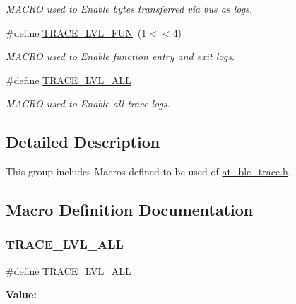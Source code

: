 \begin{DoxyCompactItemize}
\begin{DoxyCompactList}\small\item\em M\+A\+C\+RO used to Enable bytes transferred via bus as logs. \end{DoxyCompactList}\item 
\#define \mbox{\hyperlink{group__dbg__logs__group__macros_ga6c483b2388f6352f68b9a9be81474a74}{T\+R\+A\+C\+E\+\_\+\+L\+V\+L\+\_\+\+F\+UN}}~(1$<$$<$4)
\begin{DoxyCompactList}\small\item\em M\+A\+C\+RO used to Enable function entry and exit logs. \end{DoxyCompactList}\item 
\#define \mbox{\hyperlink{group__dbg__logs__group__macros_gad537d4d9e95c7c0b8df1b63c9675b69f}{T\+R\+A\+C\+E\+\_\+\+L\+V\+L\+\_\+\+A\+LL}}
\begin{DoxyCompactList}\small\item\em M\+A\+C\+RO used to Enable all trace logs. \end{DoxyCompactList}\end{DoxyCompactItemize}


\subsection{Detailed Description}
This group includes Macros defined to be used of \mbox{\hyperlink{at__ble__trace_8h}{at\+\_\+ble\+\_\+trace.\+h}}. 



\subsection{Macro Definition Documentation}
\mbox{\label{group__dbg__logs__group__macros_gad537d4d9e95c7c0b8df1b63c9675b69f}} 
\subsubsection{\texorpdfstring{TRACE\_LVL\_ALL}{TRACE\_LVL\_ALL}}
{\footnotesize\ttfamily \#define T\+R\+A\+C\+E\+\_\+\+L\+V\+L\+\_\+\+A\+LL}

{\bfseries Value\+:}
\begin{DoxyCode}{0}

\end{DoxyCode}


